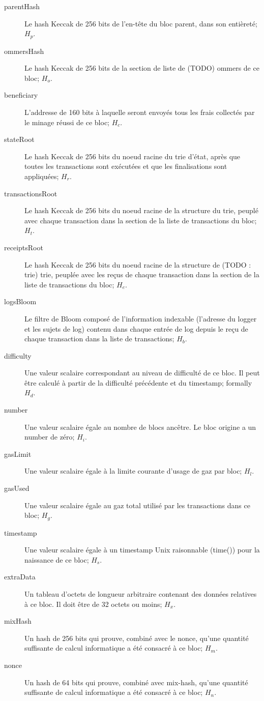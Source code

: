 \documentclass[9pt,oneside]{amsart}
\begin{document}
\begin{multicols}{2}
\begin{description}
\item[parentHash] Le hash Keccak de 256 bits de l'en-tête du bloc parent, dans son entièreté; $H_p$.
\item[ommersHash] Le hash Keccak de 256 bits de la section de liste de (TODO) ommers de ce bloc; $H_o$.
\item[beneficiary] L'addresse de 160 bits à laquelle seront envoyés tous les frais collectés par le minage réussi de ce bloc; $H_c$.
\item[stateRoot]  Le hash Keccak de 256 bits du noeud racine du trie d'état, après que toutes les transactions sont exécutées et que les finalisations sont appliquées; $H_r$.
\item[transactionsRoot] Le hash Keccak de 256 bits du noeud racine de la structure du trie, peuplé avec chaque transaction dans la section de la liste de transactions du bloc; $H_t$.
\item[receiptsRoot] Le hash Keccak de 256 bits du noeud racine de la structure de  (TODO : trie) trie, peuplée avec les reçus de chaque transaction dans la section de la liste de transactions du bloc; $H_e$.
\item[logsBloom] Le filtre de Bloom composé de l'information indexable (l'adresse du logger et les sujets de log) contenu dans chaque entrée de log depuis le reçu de chaque transaction dans la liste de transactions; $H_b$.
\item[difficulty] Une valeur scalaire correspondant au niveau de difficulté de ce bloc. Il peut être calculé à partir de la difficulté précédente et du timestamp; formally $H_d$.
\item[number] Une valeur scalaire égale au nombre de blocs ancêtre. Le bloc origine a un number de zéro; $H_i$.
\item[gasLimit] Une valeur scalaire égale à la limite courante d'usage de gaz par bloc; $H_l$.
\item[gasUsed] Une valeur scalaire égale au gaz total utilisé par les transactions dans ce bloc; $H_g$.
\item[timestamp] Une valeur scalaire égale à un timestamp Unix raisonnable (time()) pour la naissance de ce bloc; $H_s$.
\item[extraData] Un tableau d'octets de longueur arbitraire contenant des données relatives à ce bloc. Il doit être de 32 octets ou moins; $H_x$.
\item[mixHash] Un hash de 256 bits qui prouve, combiné avec le nonce, qu'une quantité suffisante de calcul informatique a été consacré à ce bloc; $H_m$.
\item[nonce] Un hash de 64 bits qui prouve, combiné avec mix-hash, qu'une quantité suffisante de calcul informatique a été consacré à ce bloc; $H_n$.
\end{description}


\end{multicols}
\end{document}

